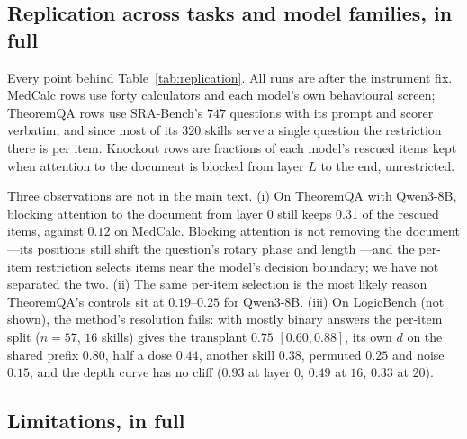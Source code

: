 \documentclass{article}
\newcommand{\dvec}{\ensuremath{d}}
\begin{document}
\subsection{Replication across tasks and model families, in full}
\label{app:replication}

Every point behind Table~\ref{tab:replication}. All runs are after the
instrument fix. MedCalc rows use forty calculators and each model's own
behavioural screen; TheoremQA rows use SRA-Bench's $747$ questions with its
prompt and scorer verbatim, and since most of its $320$ skills serve a single
question the restriction there is per item. Knockout rows are fractions of each
model's rescued items kept when attention to the document is blocked from layer
$L$ to the end, unrestricted.

\begin{table}[h]
\caption{The replication curves. Battery, sufficiency and rank are $\rho$
(Eq.~\ref{eq:rho}) on the restricted split; necessity is the fraction of rescued
items kept. ``Another family'' (MedCalc) and ``another skill'' (TheoremQA) are
the transfer controls available in each set.}
\label{tab:replicationfull}
\centering
\scriptsize
\setlength{\tabcolsep}{3pt}

\end{table}

Three observations are not in the main text. (i) On TheoremQA with Qwen3-8B,
blocking attention to the document from layer $0$ still keeps $0.31$ of the
rescued items, against $0.12$ on MedCalc. Blocking attention is not removing
the document---its positions still shift the question's rotary phase and length
---and the per-item restriction selects items near the model's decision
boundary; we have not separated the two. (ii) The same per-item selection is the
most likely reason TheoremQA's controls sit at $0.19$--$0.25$ for Qwen3-8B. (iii)
On LogicBench (not shown), the method's resolution fails: with mostly binary
answers the per-item split ($n=57$, $16$ skills) gives the transplant $0.75$
$[0.60, 0.88]$, its own $\dvec$ on the shared prefix $0.80$, half a dose $0.44$, another skill
$0.38$, permuted $0.25$ and noise $0.15$, and the depth curve has no cliff
($0.93$ at layer $0$, $0.49$ at $16$, $0.33$ at $20$).

\subsection{Limitations, in full}
\label{app:limits}
\end{document}
